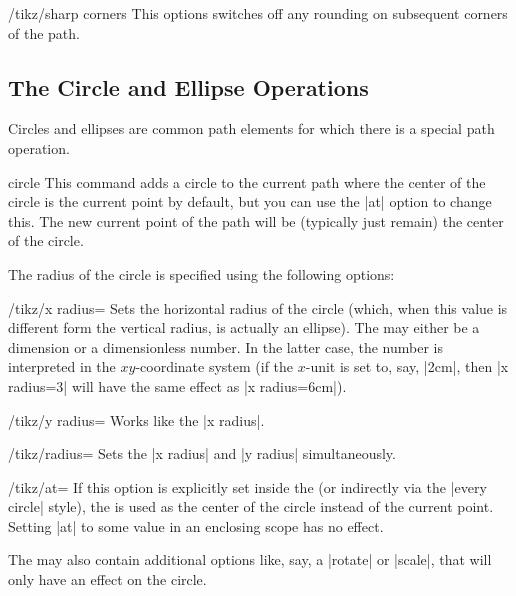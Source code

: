 \begin{key}{/tikz/sharp corners}
  This options switches off any rounding on subsequent corners of the
  path.
\end{key}



\subsection{The Circle and Ellipse Operations}

Circles and ellipses are common path elements for which there is a
special path operation.

\begin{pathoperation}{circle}{}
  This command adds a circle to the current path where the center of
  the circle is the current point by default, but you can use the |at|
  option to change this. The new current point of the path
  will be (typically just remain) the center of the circle.

  The radius of the circle is specified using the following options:
  \begin{key}{/tikz/x radius=}
    Sets the horizontal radius of the circle (which, when this value
    is different form the vertical radius, is actually an
    ellipse). The  may either be a dimension or a
    dimensionless number. In the latter case, the number is
    interpreted in the $xy$-coordinate system (if the $x$-unit is set
    to, say, |2cm|, then |x radius=3| will have the same effect as
    |x radius=6cm|).
  \end{key}
  \begin{key}{/tikz/y radius=}
    Works like the |x radius|.
  \end{key}
  \begin{key}{/tikz/radius=}
    Sets the |x radius| and |y radius| simultaneously.
  \end{key}
  \begin{key}{/tikz/at=}
    If this option is explicitly set inside the  (or
    indirectly via the |every circle| style), the  is
    used as the center of the circle instead of the current
    point. Setting |at| to some value in an enclosing scope has no
    effect.
  \end{key}
  The  may also contain additional options like, say, a
  |rotate| or |scale|, that will only have an effect on the circle.
\begin{codeexample}[]
\end{codeexample}


\end{pathoperation}
